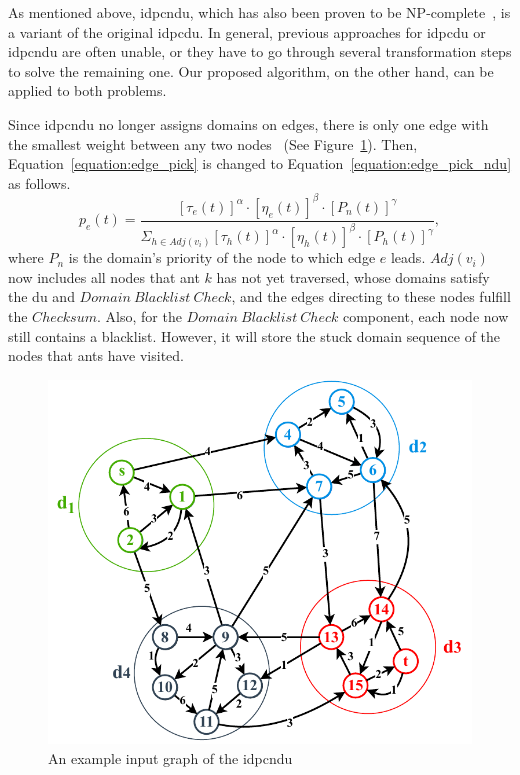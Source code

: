 As mentioned above, \acrshort{idpcndu}, which has also been proven to be NP-complete~\cite{maggi2018domain}, is a variant of the original \gls{idpcdu}. In general, previous approaches for \gls{idpcdu} or \acrshort{idpcndu} are often unable, or they have to go through several transformation steps to solve the remaining one. Our proposed algorithm, on the other hand, can be applied to both problems. 

Since \acrshort{idpcndu} no longer assigns domains on edges, there is only one edge with the smallest weight between any two nodes~\cite{binh2021two} (See Figure~\ref{fig:idpc-ndu-example}). Then, Equation~\ref{equation:edge_pick} is changed to Equation~\ref{equation:edge_pick_ndu} as follows.
\begin{equation}
	\label{equation:edge_pick_ndu}
	p_e(t) = 
	\frac{[\tau_e(t)]^{\alpha} \cdot [\eta_e(t)]^{\beta} \cdot  [P_n(t)]^{\gamma}}{\Sigma_{h \in Adj(v_i)} [\tau_h(t)]^{\alpha} \cdot [\eta_h(t)]^{\beta} \cdot [P_h(t)]^{\gamma}},
\end{equation}
where $P_n$ is the domain's priority of the node to which edge $e$ leads. $Adj(v_i)$ now includes all nodes that ant $k$ has not yet traversed, whose domains satisfy the \gls{du} and $Domain~Blacklist~Check$, and the edges directing to these nodes fulfill the $Checksum$.
Also, for the $Domain~Blacklist~Check$ component, each node now still contains a blacklist. However, it will store the stuck domain sequence of the nodes that ants have visited.
\bigskip
\setlength{\intextsep}{3pt}
\renewcommand{\scalefigure}{.9}
\begin{figure}[htbp]
	\centering
	\includegraphics[scale=\scalefigure]{Figures/chap 3/IDPC-NDU.pdf}
	\caption{An example input graph of the \gls{idpcndu}}
	\label{fig:idpc-ndu-example}
\end{figure}